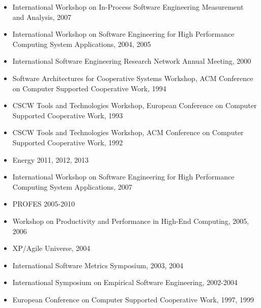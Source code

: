 \documentclass[11pt,letterpaper,sans]{moderncv} %
\begin{document}
\begin{itemize}
\item International Workshop on In-Process Software Engineering Measurement and Analysis, 2007
\item International Workshop on Software Engineering for High Performance Computing
  System Applications, 2004, 2005
\item International Software Engineering Research Network Annual Meeting, 2000
\item Software Architectures for Cooperative Systems Workshop, ACM Conference on
  Computer Supported Cooperative Work, 1994
\item CSCW Tools and Technologies Workshop, European Conference on Computer Supported
  Cooperative Work, 1993 
\item CSCW Tools and Technologies Workshop, ACM Conference on Computer Supported Cooperative Work, 1992 
\end{itemize}

\begin{itemize}
\item Energy 2011, 2012, 2013
\item International Workshop on Software Engineering for High Performance Computing
  System Applications, 2007
\item PROFES 2005-2010
\item Workshop on Productivity and Performance in High-End Computing, 2005, 2006
\item XP/Agile Universe, 2004
\item International Software Metrics Symposium, 2003, 2004
\item International Symposium on Empirical Software Engineering, 2002-2004
\item European Conference on Computer Supported Cooperative Work, 1997, 1999
\end{itemize}







\end{document}
